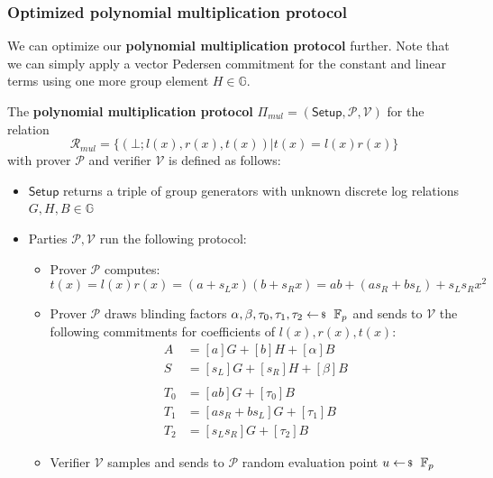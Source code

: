 \documentclass[../../book.tex]{subfiles}
\begin{document}
\subsubsection{Optimized polynomial multiplication protocol}
We can optimize our \textbf{polynomial multiplication protocol} further. Note that we can simply apply a vector Pedersen commitment for the constant and linear terms using one more group element $H \in \mathbb{G}$.

\begin{definition}
    The \textbf{polynomial multiplication protocol} $\Pi_{mul} = (\mathsf{Setup}, \mathcal{P,V})$ for the relation $$\mathcal{R}_{mul} = \{ (\bot;l(x),r(x),t(x)) \vert t(x) = l(x)r(x)\}$$ with prover $\mathcal{P}$ and verifier $\mathcal{V}$ is defined as follows:
    \begin{itemize}
        \item $\mathsf{Setup}$ returns a triple of group generators with unknown discrete log relations $G, H, B \in \mathbb{G}$
        \item Parties $\mathcal{P, V}$ run the following protocol:
            \begin{itemize}
                \item Prover $\mathcal{P}$ computes:
                    $$t(x) = l(x)r(x) = (a+s_L x)(b+s_R x) = ab + (as_R + bs_L) + s_L s_R x^2$$
                \item Prover $\mathcal{P}$ draws blinding factors $\alpha, \beta, \tau_0, \tau_1, \tau_2 \leftarrowS \mathbb{F}_p$ and sends to $\mathcal{V}$ the following commitments for coefficients of $l(x), r(x), t(x)$:
                    \begin{equation}
                        \begin{aligned}
                            A &= [a]G + [b]H + [\alpha]B\\
                            S &= [s_L]G + [s_R]H + [\beta]B\\
                            &\\ %
                            T_0 &= [ab]G + [\tau_0]B \\
                            T_1 &= [as_R + bs_L]G + [\tau_1]B \\
                            T_2 &= [s_L s_R]G + [\tau_2]B
                        \end{aligned}
                    \end{equation}
                \item Verifier $\mathcal{V}$ samples and sends to $\mathcal{P}$ random evaluation point $u \leftarrowS \mathbb{F}_p$

\end{itemize}
\end{itemize}
\end{definition}
\end{document}
